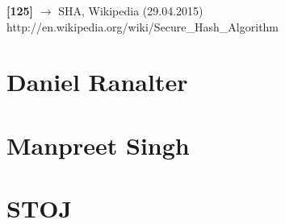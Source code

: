 \documentclass[12pt,a4paper]{report}
\begin{document}
\begin{onehalfspace}
\noindent
\textbf{[125]} $\rightarrow$ SHA, Wikipedia (29.04.2015)\\
http://en.wikipedia.org/wiki/Secure\_Hash\_Algorithm\\

\chapter{Daniel Ranalter}

\chapter{Manpreet Singh}

\chapter{STOJ}

\end{onehalfspace}
\end{document}
